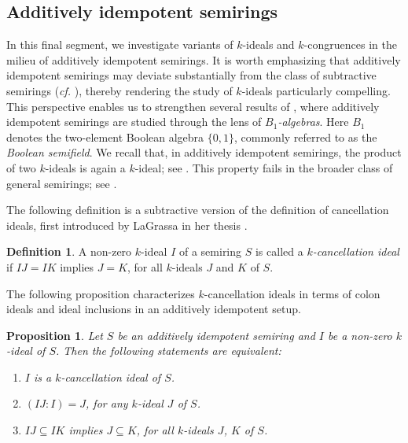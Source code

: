 \documentclass[11pt,leqno]{amsart}
\newtheorem{proposition}[theorem]{Proposition}
\theoremstyle{definition}
\newtheorem{definition}[theorem]{Definition}
\numberwithin{equation}{section}
\begin{document}
\smallskip
\subsection{Additively idempotent semirings}\label{Subsection: additively idempotent}


In this final segment, we investigate variants of $k$-ideals and $k$-congruences in the milieu of additively idempotent semirings. It is worth emphasizing that additively idempotent semirings may deviate substantially from the class of subtractive semirings (\textit{cf.} \cite[Example 6.39]{Golan}), thereby rendering the study of $k$-ideals particularly compelling.
This perspective enables us to strengthen several results of \cite{Lescot11, Lescot15}, where additively idempotent semirings are studied through the lens of \emph{$B_1$-algebras}. Here $B_1$ denotes the two-element Boolean algebra $\{0,1\}$, commonly referred to as the \emph{Boolean semifield}. We recall that, in additively idempotent semirings, the product of two $k$-ideals is again a $k$-ideal; see \cite[Lemma 3.27]{JunRayTolliver22}. This property fails in the broader class of general semirings; see \cite[Example 6.43]{Golan}.

The following definition is a subtractive version of the definition of cancellation ideals, first introduced by LaGrassa in her thesis \cite{LaGrassa95}.

\begin{definition}
A non-zero $k$-ideal $I$ of a semiring $S$ is called a \emph{$k$-cancellation ideal} if $IJ = IK$ implies $J = K$, for all $k$-ideals $J$ and $K$ of $S$.
\end{definition}
The following proposition characterizes $k$-cancellation ideals in terms of colon ideals and ideal inclusions in an additively idempotent setup. 
\begin{proposition}
Let $S$ be an additively idempotent semiring and $I$ be a non-zero $k$-ideal of $S$. Then the following statements are equivalent:
\begin{enumerate}
\item $I$ is a $k$-cancellation ideal of $S$.

\item $(IJ : I)=J$, for any $k$-ideal $J$ of $S$.

\item $IJ\subseteq IK$ implies $J\subseteq K$, for all $k$-ideals $J$, $K$ of $S$.
\end{enumerate}
\end{proposition}
\end{document}

